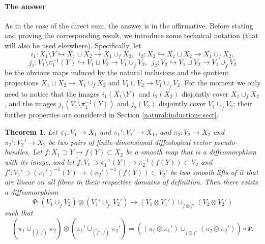 \documentclass{article}
\newtheorem{thm}[lemma]{Theorem}
\begin{document}
\paragraph{The answer} As in the case of the direct sum, the answer is in the affirmative. Before stating and proving the corresponding result, we introduce some technical notation (that will also be used 
elsewhere). Specifically, let
$$i_1:X_1\setminus Y\hookrightarrow X_1\sqcup X_2\to X_1\cup_f X_2,\,\,\,i_2:X_2\hookrightarrow X_1\sqcup X_2\to X_1\cup_f X_2,$$
$$j_1:V_1\setminus\pi_1^{-1}(Y)\hookrightarrow V_1\sqcup V_2\to V_1\cup_{\tilde{f}}V_2,\,\,\,j_2:V_2\hookrightarrow V_1\sqcup V_2\to V_1\cup_{\tilde{f}}V_2$$
be the obvious maps induced by the natural inclusions and the quotient projections $X_1\sqcup X_2\to X_1\cup_f X_2$ and $V_1\sqcup V_2\to V_1\cup_{\tilde{f}}V_2$. For the moment we only need 
to notice that the images $i_1(X_1\setminus Y)$ and $i_2(X_2)$ disjointly cover $X_1\cup_f X_2$, and the images $j_1(V_1\setminus\pi_1^{-1}(Y))$ and $j_2(V_2)$ disjointly cover $V_1\cup_{\tilde{f}}V_2$; 
their further properties are considered in Section \ref{natural:inductions:sect}.

\begin{thm}
Let $\pi_1:V_1\to X_1$ and $\pi_1':V_1'\to X_1$, and $\pi_2:V_2\to X_2$ and $\pi_2':V_2'\to X_2$ be two pairs of finite-dimensional diffeological vector pseudo-bundles. Let $f:X_1\supset Y\to f(Y)\subset X_2$ 
be a smooth map that is a diffeomorphism with its image, and let $\tilde{f}:V_1\supset\pi_1^{-1}(Y)\to\pi_2^{-1}(f(Y))\subset V_2$ and $\tilde{f}':V_1'\supset(\pi_1')^{-1}(Y)\to(\pi_2')^{-1}(f(Y))\subset V_2'$ be 
two smooth lifts of it that are linear on all fibres in their respective domains of definition. Then there exists a diffeomorphism
$$\Psi:(V_1\cup_{\tilde{f}}V_2)\otimes(V_1'\cup_{\tilde{f}'}V_2')\to(V_1\otimes V_1')\cup_{\tilde{f}\otimes\tilde{f}'}(V_2\otimes V_2')$$ such that
$$(\pi_1\cup_{(\tilde{f},f)}\pi_2)\otimes(\pi_1'\cup_{(\tilde{f}',f)}\pi_2')=\left((\pi_1\otimes\pi_1')\cup_{\tilde{f}\otimes\tilde{f}'}(\pi_2\otimes\pi_2')\right)\circ\Psi.$$
\end{thm}
\end{document}
